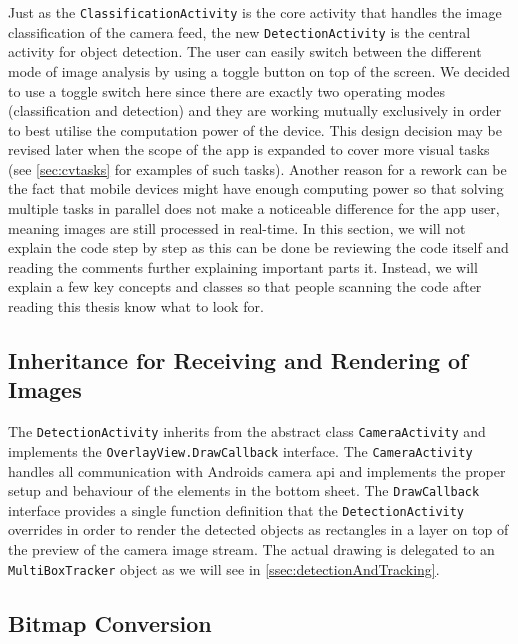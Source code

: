 \documentclass[
			   fontsize=11pt,
               paper=a4,
               bibliography=totoc,
               idxtotoc,
               headsepline,
               footsepline,
               footinclude=false,
               BCOR=12mm,
               DIV=13,
               openany,   %
               ]
               {scrbook}
\newcommand{\code}[1]{\lstinline[basicstyle = \ttfamily\small]{#1}} %
\begin{document}
Just as the \code{ClassificationActivity} is the core activity that handles the image classification of the camera feed, the new \code{DetectionActivity} is the central activity for object detection. The user can easily switch between the different mode of image analysis by using a toggle button on top of the screen. We decided to use a toggle switch here since there are exactly two operating modes (classification and detection) and they are working mutually exclusively in order to best utilise the computation power of the device. This design decision may be revised later when the scope of the app is expanded to cover more visual tasks (see \autoref{sec:cvtasks} for examples of such tasks). Another reason for a rework can be the fact that mobile devices might have enough computing power so that solving multiple tasks in parallel does not make a noticeable difference for the app user, meaning images are still processed in real-time. In this section, we will not explain the code step by step as this can be done be reviewing the code itself and reading the comments further explaining important parts it. Instead, we will explain a few key concepts and classes so that people scanning the code after reading this thesis know what to look for.

\subsection{Inheritance for Receiving and Rendering of Images}

The \code{DetectionActivity} inherits from the abstract class \code{CameraActivity} and implements the \code{OverlayView.DrawCallback} interface. The \code{CameraActivity} handles all communication with Androids camera \gls{api} and implements the proper setup and behaviour of the elements in the bottom sheet. The \code{DrawCallback} interface provides a single function definition that the \code{DetectionActivity} overrides in order to render the detected objects as rectangles in a layer on top of the preview of the camera image stream. The actual drawing is delegated to an \code{MultiBoxTracker} object as we will see in \autoref{ssec:detectionAndTracking}.

\subsection{Bitmap Conversion}
\end{document}
